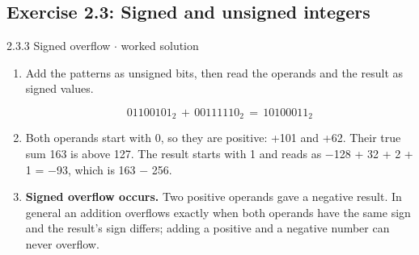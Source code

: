 \documentclass[11pt]{article}
\begin{document}
\begin{keepsection}\subsection{Exercise 2.3: Signed and unsigned integers}

\begin{workedbox}{2.3.3 Signed overflow \ensuremath{\cdot} worked solution}
\begin{enumerate}
\item {}
Add the patterns as unsigned bits, then read the operands and the result as signed values.

\begin{equation*}01100101_{2}\, +\, 00111110_{2}\, =\, 10100011_{2}\end{equation*}
\item Both operands start with 0, so they are positive: +101 and +62. Their true sum 163 is above 127. The result starts with 1 and reads as \ensuremath{-}128 + 32 + 2 + 1 = \ensuremath{-}93, which is 163 \ensuremath{-} 256.
\item \textbf{Signed overflow occurs.} Two positive operands gave a negative result. In general an addition overflows exactly when both operands have the same sign and the result's sign differs; adding a positive and a negative number can never overflow.
\end{enumerate}
\end{workedbox}

\end{keepsection}
\end{document}
